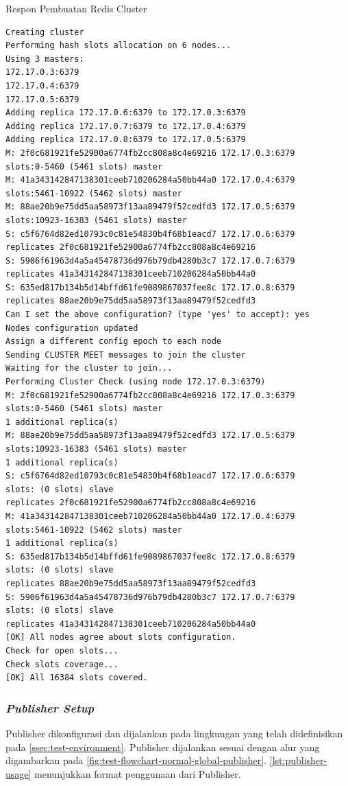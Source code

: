 \begin{listing}[!]
	\caption{Respon Pembuatan Redis Cluster}
	\label{lst:redis_trib_cluster_response}
	\begin{verbatim}
Creating cluster
Performing hash slots allocation on 6 nodes...
Using 3 masters:
172.17.0.3:6379
172.17.0.4:6379
172.17.0.5:6379
Adding replica 172.17.0.6:6379 to 172.17.0.3:6379
Adding replica 172.17.0.7:6379 to 172.17.0.4:6379
Adding replica 172.17.0.8:6379 to 172.17.0.5:6379
M: 2f0c681921fe52900a6774fb2cc808a8c4e69216 172.17.0.3:6379
slots:0-5460 (5461 slots) master
M: 41a343142847138301ceeb710206284a50bb44a0 172.17.0.4:6379
slots:5461-10922 (5462 slots) master
M: 88ae20b9e75dd5aa58973f13aa89479f52cedfd3 172.17.0.5:6379
slots:10923-16383 (5461 slots) master
S: c5f6764d82ed10793c0c81e54830b4f68b1eacd7 172.17.0.6:6379
replicates 2f0c681921fe52900a6774fb2cc808a8c4e69216
S: 5906f61963d4a5a45478736d976b79db4280b3c7 172.17.0.7:6379
replicates 41a343142847138301ceeb710206284a50bb44a0
S: 635ed817b134b5d14bffd61fe9089867037fee8c 172.17.0.8:6379
replicates 88ae20b9e75dd5aa58973f13aa89479f52cedfd3
Can I set the above configuration? (type 'yes' to accept): yes
Nodes configuration updated
Assign a different config epoch to each node
Sending CLUSTER MEET messages to join the cluster
Waiting for the cluster to join...
Performing Cluster Check (using node 172.17.0.3:6379)
M: 2f0c681921fe52900a6774fb2cc808a8c4e69216 172.17.0.3:6379
slots:0-5460 (5461 slots) master
1 additional replica(s)
M: 88ae20b9e75dd5aa58973f13aa89479f52cedfd3 172.17.0.5:6379
slots:10923-16383 (5461 slots) master
1 additional replica(s)
S: c5f6764d82ed10793c0c81e54830b4f68b1eacd7 172.17.0.6:6379
slots: (0 slots) slave
replicates 2f0c681921fe52900a6774fb2cc808a8c4e69216
M: 41a343142847138301ceeb710206284a50bb44a0 172.17.0.4:6379
slots:5461-10922 (5462 slots) master
1 additional replica(s)
S: 635ed817b134b5d14bffd61fe9089867037fee8c 172.17.0.8:6379
slots: (0 slots) slave
replicates 88ae20b9e75dd5aa58973f13aa89479f52cedfd3
S: 5906f61963d4a5a45478736d976b79db4280b3c7 172.17.0.7:6379
slots: (0 slots) slave
replicates 41a343142847138301ceeb710206284a50bb44a0
[OK] All nodes agree about slots configuration.
Check for open slots...
Check slots coverage...
[OK] All 16384 slots covered.
	\end{verbatim}
\end{listing}


\subsubsection{\textit{Publisher Setup}}
Publisher dikonfigurasi dan dijalankan pada lingkungan yang telah didefinisikan pada \autoref{ssec:test-environment}. Publisher dijalankan sesuai dengan alur yang digambarkan pada \autoref{fig:test-flowchart-normal-global-publisher}. \autoref{lst:publisher-usage} menunjukkan format penggunaan dari Publisher.


